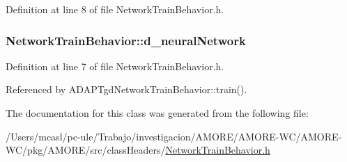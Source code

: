 Definition at line 8 of file NetworkTrainBehavior.h.

\hypertarget{class_network_train_behavior_a8aeb49c74086173b7d1623da8567901d}{
\subsubsection[{d\_\-neuralNetwork}]{ {\bf NetworkTrainBehavior::d\_\-neuralNetwork}}}
\label{class_network_train_behavior_a8aeb49c74086173b7d1623da8567901d}


Definition at line 7 of file NetworkTrainBehavior.h.



Referenced by ADAPTgdNetworkTrainBehavior::train().



The documentation for this class was generated from the following file:\begin{DoxyCompactItemize}
\item 
/Users/mcasl/pc-\/ule/Trabajo/investigacion/AMORE/AMORE-\/WC/AMORE-\/WC/pkg/AMORE/src/classHeaders/\hyperlink{_network_train_behavior_8h}{NetworkTrainBehavior.h}\end{DoxyCompactItemize}
